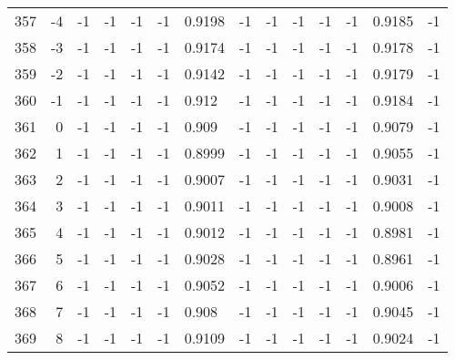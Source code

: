 \begin{table}[p]
{\begin{minipage}{\textheight}
\begin{tabular}{rr||lll|lll||lll|lll}
357     & -4   & -1      & -1      & -1            & -1     & 0.9198 & -1             & -1       & -1       & -1             & -1      & 0.9185  & -1              \\
358     & -3   & -1      & -1      & -1            & -1     & 0.9174 & -1             & -1       & -1       & -1             & -1      & 0.9178  & -1              \\
359     & -2   & -1      & -1      & -1            & -1     & 0.9142 & -1             & -1       & -1       & -1             & -1      & 0.9179  & -1              \\
360     & -1   & -1      & -1      & -1            & -1     & 0.912  & -1             & -1       & -1       & -1             & -1      & 0.9184  & -1              \\
361     & 0    & -1      & -1      & -1            & -1     & 0.909  & -1             & -1       & -1       & -1             & -1      & 0.9079  & -1              \\
362     & 1    & -1      & -1      & -1            & -1     & 0.8999 & -1             & -1       & -1       & -1             & -1      & 0.9055  & -1              \\
363     & 2    & -1      & -1      & -1            & -1     & 0.9007 & -1             & -1       & -1       & -1             & -1      & 0.9031  & -1              \\
364     & 3    & -1      & -1      & -1            & -1     & 0.9011 & -1             & -1       & -1       & -1             & -1      & 0.9008  & -1              \\
365     & 4    & -1      & -1      & -1            & -1     & 0.9012 & -1             & -1       & -1       & -1             & -1      & 0.8981  & -1              \\
366     & 5    & -1      & -1      & -1            & -1     & 0.9028 & -1             & -1       & -1       & -1             & -1      & 0.8961  & -1              \\
367     & 6    & -1      & -1      & -1            & -1     & 0.9052 & -1             & -1       & -1       & -1             & -1      & 0.9006  & -1              \\
368     & 7    & -1      & -1      & -1            & -1     & 0.908  & -1             & -1       & -1       & -1             & -1      & 0.9045  & -1              \\
369     & 8    & -1      & -1      & -1            & -1     & 0.9109 & -1             & -1       & -1       & -1             & -1      & 0.9024  & -1              \\

\end{tabular}
\end{minipage}}
\end{table}
